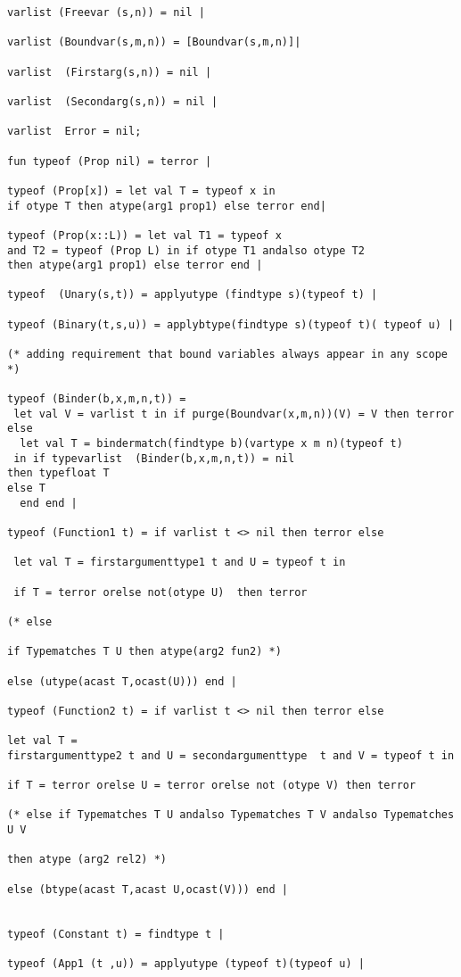 \documentclass{article}
\begin{document}
{{\begin{verbatim}
varlist (Freevar (s,n)) = nil |

varlist (Boundvar(s,m,n)) = [Boundvar(s,m,n)]|

varlist  (Firstarg(s,n)) = nil |

varlist  (Secondarg(s,n)) = nil |

varlist  Error = nil;

fun typeof (Prop nil) = terror |

typeof (Prop[x]) = let val T = typeof x in
if otype T then atype(arg1 prop1) else terror end|

typeof (Prop(x::L)) = let val T1 = typeof x 
and T2 = typeof (Prop L) in if otype T1 andalso otype T2
then atype(arg1 prop1) else terror end |

typeof  (Unary(s,t)) = applyutype (findtype s)(typeof t) |

typeof (Binary(t,s,u)) = applybtype(findtype s)(typeof t)( typeof u) |

(* adding requirement that bound variables always appear in any scope *)

typeof (Binder(b,x,m,n,t)) =
 let val V = varlist t in if purge(Boundvar(x,m,n))(V) = V then terror else
  let val T = bindermatch(findtype b)(vartype x m n)(typeof t)
 in if typevarlist  (Binder(b,x,m,n,t)) = nil
then typefloat T
else T 
  end end |

typeof (Function1 t) = if varlist t <> nil then terror else

 let val T = firstargumenttype1 t and U = typeof t in

 if T = terror orelse not(otype U)  then terror 

(* else 

if Typematches T U then atype(arg2 fun2) *)

else (utype(acast T,ocast(U))) end |

typeof (Function2 t) = if varlist t <> nil then terror else 

let val T = 
firstargumenttype2 t and U = secondargumenttype  t and V = typeof t in 

if T = terror orelse U = terror orelse not (otype V) then terror 

(* else if Typematches T U andalso Typematches T V andalso Typematches U V

then atype (arg2 rel2) *)

else (btype(acast T,acast U,ocast(V))) end |
  

typeof (Constant t) = findtype t |

typeof (App1 (t ,u)) = applyutype (typeof t)(typeof u) |


\end{verbatim}}}
\end{document}
